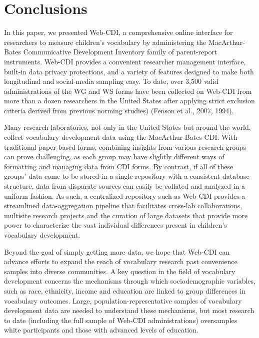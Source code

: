 \documentclass[
  english,
  ,man,floatsintext]{apa6}
\begin{document}
\hypertarget{conclusions}{%
\section{Conclusions}\label{conclusions}}

In this paper, we presented Web-CDI, a comprehensive online interface for researchers to measure children's vocabulary by administering the MacArthur-Bates Communicative Development Inventory family of parent-report instruments. Web-CDI provides a convenient researcher management interface, built-in data privacy protections, and a variety of features designed to make both longitudinal and social-media sampling easy. To date, over 3,500 valid administrations of the WG and WS forms have been collected on Web-CDI from more than a dozen researchers in the United States after applying strict exclusion criteria derived from previous norming studies) (Fenson et al., 2007, 1994).

Many research laboratories, not only in the United States but around the world, collect vocabulary development data using the MacArthur-Bates CDI. With traditional paper-based forms, combining insights from various research groups can prove challenging, as each group may have slightly different ways of formatting and managing data from CDI forms. By contrast, if all of these groups' data come to be stored in a single repository with a consistent database structure, data from disparate sources can easily be collated and analyzed in a uniform fashion. As such, a centralized repository such as Web-CDI provides a streamlined data-aggregation pipeline that facilitates cross-lab collaborations, multisite research projects and the curation of large datasets that provide more power to characterize the vast individual differences present in children's vocabulary development.

Beyond the goal of simply getting more data, we hope that Web-CDI can advance efforts to expand the reach of vocabulary research past convenience samples into diverse communities. A key question in the field of vocabulary development concerns the mechanisms through which sociodemographic variables, such as race, ethnicity, income and education are linked to group differences in vocabulary outcomes. Large, population-representative samples of vocabulary development data are needed to understand these mechanisms, but most research to date (including the full sample of Web-CDI administrations) oversamples white participants and those with advanced levels of education.
\end{document}
